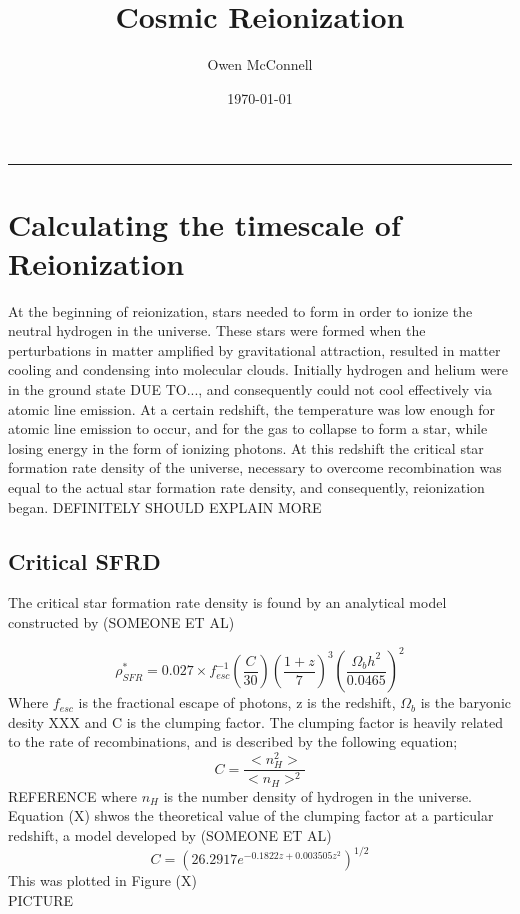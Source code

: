 \documentclass[pdf,color]{UoBnote}
\author{Owen McConnell}
\title{Cosmic Reionization}
\date{\today}
\begin{document}
\maketitle
\tableofcontents
\vspace{1cm}\hrule \vspace{1cm}
\newpage







\section{Calculating the timescale of Reionization}
At the beginning of reionization, stars needed to form in order to ionize the neutral hydrogen in the universe. These stars were formed when the perturbations in matter amplified by gravitational attraction, resulted in matter cooling and condensing into molecular clouds. Initially hydrogen and helium were in the ground state DUE TO..., and consequently could not cool effectively via atomic line emission. At a certain redshift, the temperature was low enough for atomic line emission to occur, and for the gas to collapse to form a star, while losing energy in the form of ionizing photons. At this redshift the critical star formation rate density of the universe, necessary to overcome recombination was equal to the actual star formation rate density, and consequently, reionization began. DEFINITELY SHOULD EXPLAIN MORE













\subsection{Critical SFRD}
The critical star formation rate density is found by an analytical model constructed by (SOMEONE ET AL)

\begin{equation}
\rho^*_{SFR} = 0.027 \times f^{-1}_{esc} \left (\frac{C}{30} \right ) \left (\frac{1+z}{7} \right )^3 \left (\frac{\Omega_b h^2}{0.0465} \right )^2
\end{equation}
Where $f_{esc}$ is the fractional escape of photons, z is the redshift, $\Omega_b$ is the baryonic desity XXX and C is the clumping factor. The clumping factor is heavily related to the rate of recombinations, and is described by the following equation;
\begin{equation}
C=\frac{<n^2_H>}{<n_H>^2}
\end{equation}
REFERENCE
where $n_H$ is the number density of hydrogen in the universe. Equation (X) shwos the theoretical value of the clumping factor at a particular redshift, a model developed by (SOMEONE ET AL)
\begin{equation}
C=\left (26.2917 e^{-0.1822z+0.003505z^2} \right )^{1/2}
\end{equation}
This was plotted in Figure (X)\\
\newline
PICTURE
\end{document}
